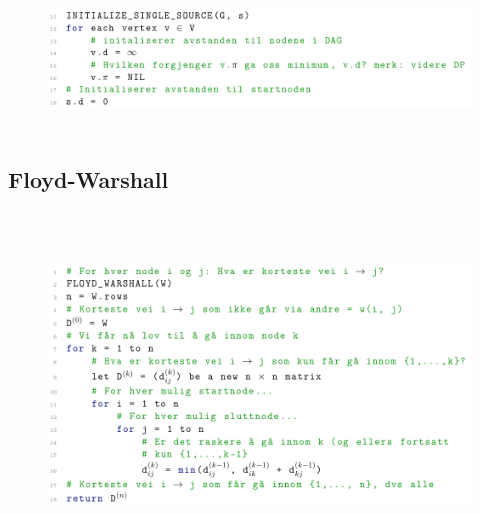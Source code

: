 \documentclass[12pt]{report}
\begin{document}
\vspace{\baselineskip}



\begin{figure}[H]
	\begin{Center}
		\includegraphics[width=6.3in,height=1.51in]{./media/image197.png}
	\end{Center}
\end{figure}






\newpage
\par

\subsection*{Floyd-Warshall}



\begin{figure}[H]
	\begin{Center}
		\includegraphics[width=6.3in,height=3.6in]{./media/image198.png}
	\end{Center}
\end{figure}
\end{document}
